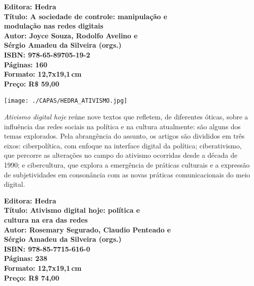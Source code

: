 \vfill
\noindent\begin{minipage}[c]{1\linewidth}
{\small\textbf{
\hspace*{-.1cm}Editora: Hedra\\
Título: A sociedade de controle: manipulação e\\modulação nas redes digitais\\
Autor: Joyce Souza, Rodolfo Avelino e\\Sérgio Amadeu da Silveira (orgs.)\\ 
ISBN: 978-65-89705-19-2\\
Páginas: 160\\
Formato: 12,7x19,1\,cm\\
Preço: R\$ 59,00\\
}}
\end{minipage}
\pagebreak

\begin{center}
\hspace*{.5cm}\texttt{[image: ./CAPAS/HEDRA\_ATIVISMO.jpg]}
\end{center}
\hspace*{-7cm}\hrulefill\hspace*{-7cm}
\medskip

\noindent{}\textit{Ativismo digital hoje} reúne nove textos que refletem, de diferentes óticas, sobre a influência das redes sociais na política e na cultura atualmente:  são alguns dos temas explorados.
Pela abrangência do assunto, os artigos são divididos em três eixos: ciberpolítica, com enfoque na interface digital da política; ciberativismo, que percorre as alterações no campo do ativismo ocorridas desde a década de 1990; e cibercultura, que explora a emergência de práticas culturais e a expressão de subjetividades em consonância com as novas práticas comunicacionais do meio digital.

\vfill
\noindent\begin{minipage}[c]{1\linewidth}
{\small\textbf{
\hspace*{-.1cm}Editora: Hedra\\
Título: Ativismo digital hoje: política e\\cultura na era das redes\\
Autor: Rosemary Segurado, Claudio Penteado e\\Sérgio Amadeu da Silveira (orgs.)\\ 
ISBN: 978-85-7715-616-0\\
Páginas: 238\\
Formato: 12,7x19,1\,cm\\
Preço: R\$ 74,00\\
}}
\end{minipage}
\pagebreak

